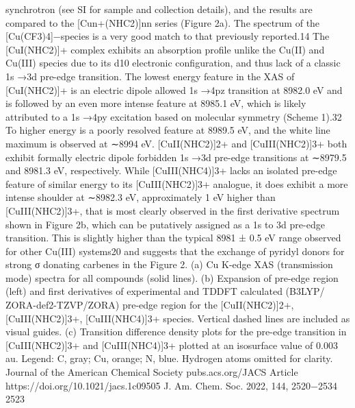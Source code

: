 \documentclass{article}
\begin{document}
synchrotron (see SI for sample and collection details), and
the results are compared to the [Cun+(NHC2)]nn series (Figure
2a). The spectrum of the [Cu(CF3)4]−species is a very good
match to that previously reported.14
The [CuI(NHC2)]+ complex exhibits an absorption proﬁle
unlike the Cu(II) and Cu(III) species due to its d10 electronic
conﬁguration, and thus lack of a classic 1s →3d pre-edge
transition. The lowest energy feature in the XAS of
[CuI(NHC2)]+ is an electric dipole allowed 1s →4pz
transition at 8982.0 eV and is followed by an even more
intense feature at 8985.1 eV, which is likely attributed to a 1s
→4py excitation based on molecular symmetry (Scheme 1).32
To higher energy is a poorly resolved feature at 8989.5 eV, and
the white line maximum is observed at ∼8994 eV.
[CuII(NHC2)]2+ and [CuIII(NHC2)]3+ both exhibit formally
electric dipole forbidden 1s →3d pre-edge transitions at
∼8979.5 and 8981.3 eV, respectively. While [CuIII(NHC4)]3+
lacks an isolated pre-edge feature of similar energy to its
[CuIII(NHC2)]3+ analogue, it does exhibit a more intense
shoulder at ∼8982.3 eV, approximately 1 eV higher than
[CuIII(NHC2)]3+, that is most clearly observed in the ﬁrst
derivative spectrum shown in Figure 2b, which can be
putatively assigned as a 1s to 3d pre-edge transition. This is
slightly higher than the typical 8981 ± 0.5 eV range observed
for other Cu(III) systems20 and suggests that the exchange of
pyridyl donors for strong σ donating carbenes in the
Figure 2. (a) Cu K-edge XAS (transmission mode) spectra for all
compounds (solid lines). (b) Expansion of pre-edge region (left) and
ﬁrst derivatives of experimental and TDDFT calculated (B3LYP/
ZORA-def2-TZVP/ZORA) pre-edge region for the [CuII(NHC2)]2+,
[CuIII(NHC2)]3+, [CuIII(NHC4)]3+ species. Vertical dashed lines are
included as visual guides. (c) Transition diﬀerence density plots for
the pre-edge transition in [CuIII(NHC2)]3+ and [CuIII(NHC4)]3+
plotted at an isosurface value of 0.003 au. Legend: C, gray; Cu,
orange; N, blue. Hydrogen atoms omitted for clarity.
Journal of the American Chemical Society
pubs.acs.org/JACS
Article
https://doi.org/10.1021/jacs.1c09505
J. Am. Chem. Soc. 2022, 144, 2520−2534
2523

\newpage

\end{document}
